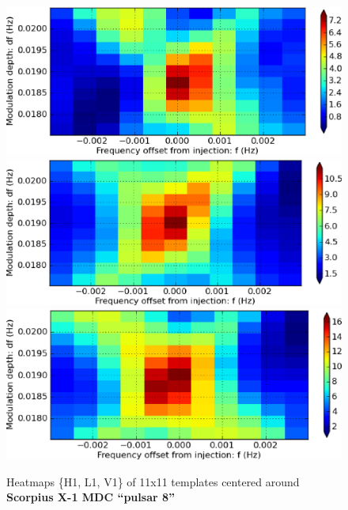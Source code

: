 \begin{figure}
\begin{center}
\includegraphics[width=0.6\paperwidth,height=0.2\paperheight]{heatmapH1.eps}
\includegraphics[width=0.6\paperwidth,height=0.2\paperheight]{heatmapL1.eps}
\includegraphics[width=0.6\paperwidth,height=0.2\paperheight]{heatmapV1.eps}
\caption{Heatmaps \{H1, L1, V1\} of 11x11 templates centered around
\newline \textbf{Scorpius X-1 MDC ``pulsar 8''}
}
\end{center}
\end{figure}



